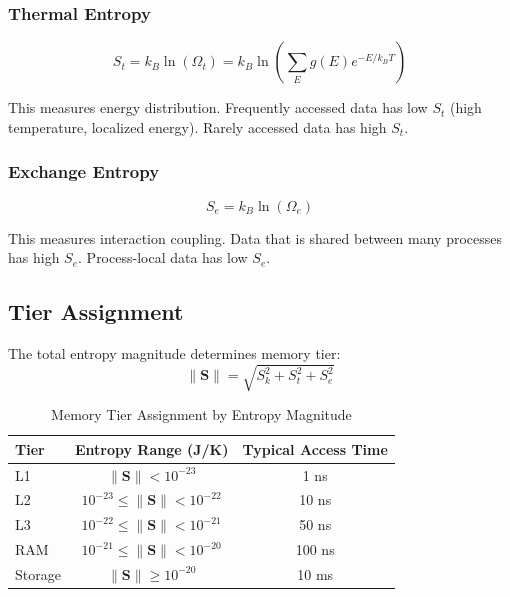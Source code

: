 \documentclass[twocolumn,10pt]{article}
\theoremstyle{definition}
\theoremstyle{remark}
\newcommand{\Scoord}{\mathbf{S}}
\begin{document}
\subsubsection{Thermal Entropy}

\begin{equation}
    S_t = k_B \ln(\Omega_t) = k_B \ln\left(\sum_E g(E) e^{-E/k_B T}\right)
\end{equation}

This measures energy distribution. Frequently accessed data has low $S_t$ (high temperature, localized energy). Rarely accessed data has high $S_t$.

\subsubsection{Exchange Entropy}

\begin{equation}
    S_e = k_B \ln(\Omega_e)
\end{equation}

This measures interaction coupling. Data that is shared between many processes has high $S_e$. Process-local data has low $S_e$.

\subsection{Tier Assignment}

The total entropy magnitude determines memory tier:
\begin{equation}
    \|\Scoord\| = \sqrt{S_k^2 + S_t^2 + S_e^2}
\end{equation}

\begin{table}[h]
\centering
\caption{Memory Tier Assignment by Entropy Magnitude}
\begin{tabular}{lcc}
\toprule
Tier & Entropy Range (J/K) & Typical Access Time \\
\midrule
L1 & $\|\Scoord\| < 10^{-23}$ & 1 ns \\
L2 & $10^{-23} \leq \|\Scoord\| < 10^{-22}$ & 10 ns \\
L3 & $10^{-22} \leq \|\Scoord\| < 10^{-21}$ & 50 ns \\
RAM & $10^{-21} \leq \|\Scoord\| < 10^{-20}$ & 100 ns \\
Storage & $\|\Scoord\| \geq 10^{-20}$ & 10 ms \\
\bottomrule
\end{tabular}
\end{table}
\end{document}
